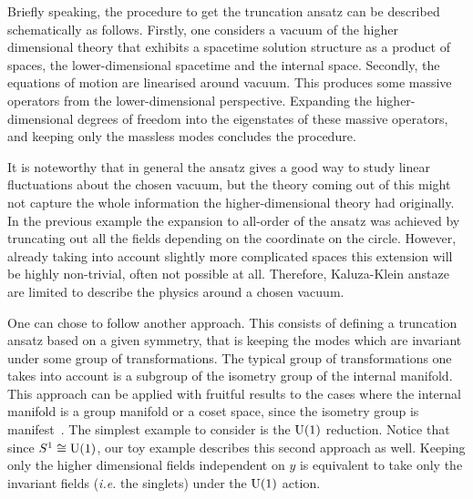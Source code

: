 \documentclass[draft]{phd}
\begin{document}
			Briefly speaking, the procedure to get the truncation ansatz can be described schematically as follows.
			Firstly, one considers a vacuum of the higher dimensional theory that exhibits a spacetime solution structure as a product of spaces, the lower-dimensional spacetime and the internal space.
			Secondly, the equations of motion are linearised around vacuum.
			This produces some massive operators from the lower-dimensional perspective.
			Expanding the higher-dimensional degrees of freedom into the eigenstates of these massive operators, and keeping only the massless modes concludes the procedure.
			
			It is noteworthy that in general the ansatz gives a good way to study linear fluctuations about the chosen vacuum, but the theory coming out of this might not capture the whole information the higher-dimensional theory had originally.
			In the previous example the expansion to all-order of the ansatz was achieved by truncating out all the fields depending on the coordinate on the circle.
			However, already taking into account slightly more complicated spaces this extension will be highly non-trivial, often not possible at all.
			Therefore, Kaluza-Klein anstaze are limited to describe the physics around a chosen vacuum.
			
			One can chose to follow another approach.
			This consists of defining a truncation ansatz based on a given symmetry, that is keeping the modes which are invariant under some group of transformations.
			The typical group of transformations one takes into account is a subgroup of the isometry group of the internal manifold.
			This approach can be applied with fruitful results to the cases where the internal manifold is a group manifold or a coset space, since the isometry group is manifest~\cite{Cvetic:2003jy, schschw}.
			The simplest example to consider is the $\mathrm{U}(1)$ reduction.
			Notice that since $S^1 \cong \mathrm{U}(1)$, our toy example describes this second approach as well.
			Keeping only the higher dimensional fields independent on $y$ is equivalent to take only the invariant fields (\emph{i.e.} the singlets) under the $\mathrm{U}(1)$ action.
			
\end{document}
